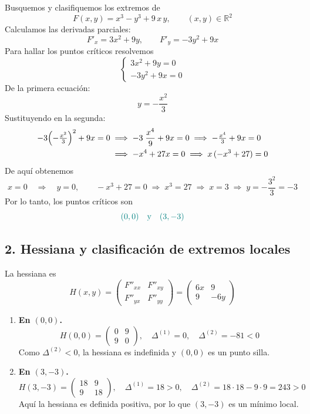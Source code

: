 \documentclass{article}
\newcommand{\R}{\ensuremath{\mathbb{R}}}
\begin{document}
Busquemos y clasifiquemos los extremos de
\[
F(x,y)=x^3 - y^3 + 9\,x\,y,\qquad (x,y)\in\R^2
\]
Calculamos las derivadas parciales:
\[
F'_x=3x^2+9y,\qquad F'_y=-3y^2+9x
\]
Para hallar los puntos críticos resolvemos
\[
\begin{cases}
3x^2 + 9y = 0\\[6pt]
-3y^2 + 9x = 0
\end{cases}
\]
De la primera ecuación:
\[
y = -\frac{x^2}{3}
\]
Sustituyendo en la segunda:
\[
\begin{aligned}
-3\Bigl(-\tfrac{x^2}{3}\Bigr)^2 + 9x = 0
&\;\Longrightarrow\;
-3\;\frac{x^4}{9} + 9x = 0
\;\Longrightarrow\;
-\tfrac{x^4}{3} + 9x = 0\\
&\;\Longrightarrow\;
-x^4 + 27x = 0
\;\Longrightarrow\;
x\,( -x^3 + 27 ) = 0
\end{aligned}
\]
De aquí obtenemos
\[
x=0
\quad\Longrightarrow\quad y=0,
\qquad
-x^3 + 27 = 0
\;\Longrightarrow\;
x^3 = 27
\;\Longrightarrow\;
x = 3
\;\Longrightarrow\;
y = -\frac{3^2}{3} = -3
\]
Por lo tanto, los puntos críticos son
\[\color{teal}
(0,0)
\quad\text{y}\quad
(3,-3)
\]

\subsection*{2. Hessiana y clasificación de extremos locales}

La hessiana es
\[
H(x,y)
=
\begin{pmatrix}
F''_{xx} & F''_{xy}\\[4pt]
F''_{yx} & F''_{yy}
\end{pmatrix}
=
\begin{pmatrix}
6x & 9\\[4pt]
9  & -6y
\end{pmatrix}
\]

\begin{enumerate}
  \item \textbf{En \((0,0)\).}
  \[
  H(0,0)
  = \begin{pmatrix}0 & 9\\[4pt]9 & 0\end{pmatrix},
  \quad \Delta^{(1)} = 0,\quad
  \Delta^{(2)}  = -81 < 0
  \]
  Como \(\Delta^{(2)}<0\), la hessiana es indefinida y \((0,0)\) es un punto silla.

  \item \textbf{En \((3,-3)\).}
  \[
  H(3,-3)
  = \begin{pmatrix}18 & 9\\[4pt]9 & 18\end{pmatrix},
  \quad \Delta^{(1)} = 18 > 0,\quad
  \Delta^{(2)} = 18\cdot18 - 9\cdot9 = 243 > 0
  \]
  Aquí la hessiana es definida positiva, por lo que \((3,-3)\) es un mínimo local.
\end{enumerate}
\end{document}
